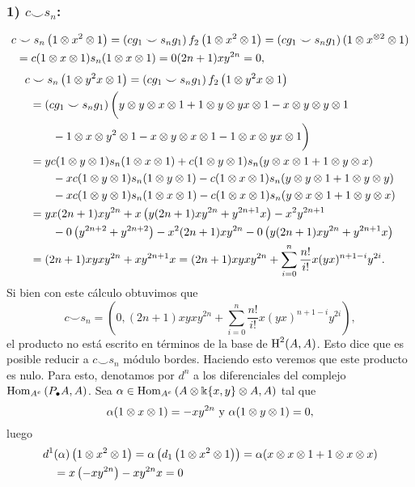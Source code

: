 \documentclass[fleqn,../tesis.tex]{subfiles}
\begin{document}
\subsubsection{1) $c \smile s_n$:}
\begin{align*}
	c &\smile s_n\left(1\otimes x^{2} \otimes 1\right) = \left(c g_1 \smile s_n g_1\right)f_2\left(1\otimes x^2 \otimes 1\right)
		= \left(c g_1 \smile s_n g_1\right)(1 \otimes x^{\otimes 2}\otimes 1)\\
	&= c(1\otimes x \otimes 1)s_n(1 \otimes x \otimes 1) = 0 (2n + 1)xy^{2n} = 0,
\end{align*}
\begin{align*}
	c &\smile s_n\left(1\otimes y^2x \otimes 1\right) = \left(c g_1 \smile s_n g_1\right)f_2\left(1\otimes y^2x \otimes 1\right)\\
	&= \left(c g_1 \smile s_n g_1\right)\bigg(y \otimes y \otimes x \otimes 1 + 1 \otimes y \otimes yx \otimes 1 
		- x \otimes y \otimes y \otimes 1\\ &\qquad - 1\otimes x \otimes y^2 \otimes 1 - x \otimes y \otimes x \otimes 1 
		- 1\otimes x \otimes yx \otimes 1\bigg) \\
	&= y c(1 \otimes y \otimes 1)s_n(1 \otimes x \otimes 1) + c(1\otimes y \otimes 1)s_n(y \otimes x \otimes 1 + 1 \otimes y \otimes x)\\
	&\qquad -xc(1\otimes y \otimes 1)s_n(1 \otimes y \otimes 1) -c(1\otimes x \otimes 1)s_n(y \otimes y \otimes 1 + 1\otimes y \otimes y)\\
	&\qquad -xc(1\otimes y \otimes 1)s_n(1 \otimes x \otimes 1) -c(1\otimes x \otimes 1)s_n(y \otimes x \otimes 1 + 1\otimes y \otimes x)\\
	&= yx(2n + 1)xy^{2n} + x\left(y(2n + 1)xy^{2n} + y^{2n + 1}x\right) - x^2y^{2n + 1} \\
	&\qquad - 0\left(y^{2n + 2} + y^{2n + 2}\right) - x^2(2n + 1)xy^{2n}
		- 0\left(y(2n + 1)xy^{2n} + y^{2n + 1} x\right)\\
	&= (2n + 1)xyxy^{2n} + xy^{2n + 1}x = (2n + 1)xyxy^{2n} + \sum_{i = 0}^{n}\frac{n!}{i!}x(yx)^{n  + 1 -i}y^{2i}.
\end{align*}
Si bien con este cálculo obtuvimos que
\[
	c \smile s_n = \left(0, (2n + 1)xyxy^{2n} + \sum_{i = 0}^{n}\frac{n!}{i!}x(yx)^{n  + 1 -i}y^{2i}\right),
\]
el producto no está escrito en términos de la base de $\operatorname{H}^{2}(A, A)$. Esto dice que es posible reducir
a $c \smile s_n$ módulo bordes. Haciendo esto veremos que este producto es nulo. Para esto,
denotamos por $d^{n}$ a los diferenciales del complejo
$\operatorname{Hom}_{A^e}\left(P_{\bullet}A, A\right)$. Sea $\alpha \in \operatorname{Hom}_{A^e}\left(A\otimes \Bbbk\{x, y\}\otimes A, A\right)$
tal que \[\alpha(1\otimes x \otimes 1) = -xy^{2n} \text{ y } \alpha(1\otimes y \otimes 1) = 0,\]
luego
\begin{align*}
	d^{1}&(\alpha)\left(1 \otimes x^{2} \otimes 1\right) = \alpha \left(d_1\left(1\otimes x^{2} \otimes 1\right)\right)
		= \alpha(x \otimes  x \otimes 1 + 1 \otimes x \otimes x) \\
	&= x \left(-xy^{2n}\right) - xy^{2n}x = 0
\end{align*}
\end{document}
